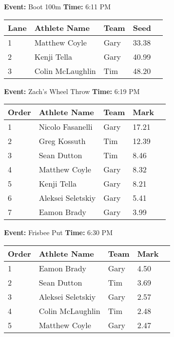 \documentclass[10pt]{article}
\begin{document}
\textbf{Event:} Boot 100m \quad \textbf{Time:} 6:11 PM 

\vspace{1em}
\begin{tabular}{@{}lllll@{}}
\toprule

\textbf{Lane} & \textbf{Athlete Name} & \textbf{Team} & \textbf{Seed} \\
\midrule
1 & Matthew Coyle & Gary & 33.38 &\\
2 & Kenji Tella & Gary & 40.99 &\\
3 & Colin McLaughlin & Tim & 48.20 &\\
\bottomrule
\end{tabular}
\vspace{2.5em}


\textbf{Event:} Zach's Wheel Throw \quad \textbf{Time:} 6:19 PM 

\vspace{1em}
\begin{tabular}{@{}lllll@{}}
\toprule

\textbf{Order} & \textbf{Athlete Name} & \textbf{Team} & \textbf{Mark} \\
\midrule
1 & Nicolo Fasanelli & Gary & 17.21 &\\
2 & Greg Kossuth & Tim & 12.39 &\\
3 & Sean Dutton & Tim & 8.46 &\\
4 & Matthew Coyle & Gary & 8.32 &\\
5 & Kenji Tella & Gary & 8.21 &\\
6 & Aleksei Seletskiy & Gary & 5.41 &\\
7 & Eamon Brady & Gary & 3.99 &\\
\bottomrule
\end{tabular}
\vspace{2.5em}


\textbf{Event:} Frisbee Put \quad \textbf{Time:} 6:30 PM 

\vspace{1em}
\begin{tabular}{@{}lllll@{}}
\toprule

\textbf{Order} & \textbf{Athlete Name} & \textbf{Team} & \textbf{Mark} \\
\midrule
1 & Eamon Brady & Gary & 4.50 &\\
2 & Sean Dutton & Tim & 3.69 &\\
3 & Aleksei Seletskiy & Gary & 2.57 &\\
4 & Colin McLaughlin & Tim & 2.48 &\\
5 & Matthew Coyle & Gary & 2.47 &\\
\bottomrule
\end{tabular}
\vspace{2.5em}
\end{document}
